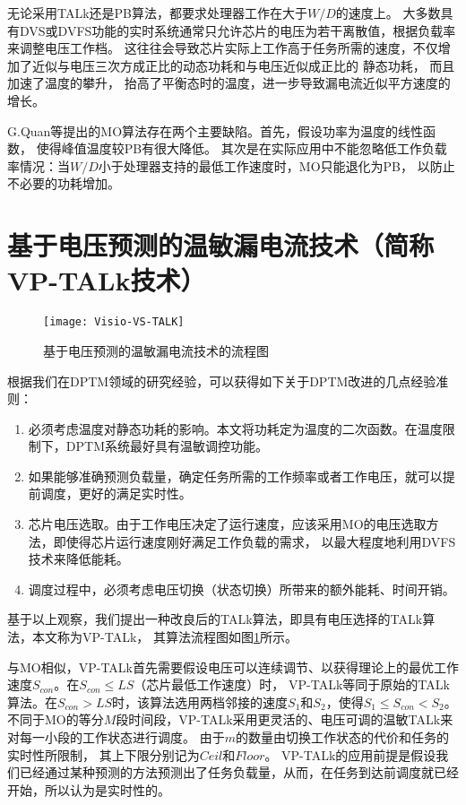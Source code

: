 无论采用TALk还是PB算法，都要求处理器工作在大于$W/D$的速度上。 大多数具有DVS或DVFS功能的实时系统通常只允许芯片的电压为若干离散值，根据负载率来调整电压工作档。 这往往会导致芯片实际上工作高于任务所需的速度，不仅增加了近似与电压三次方成正比的动态功耗和与电压近似成正比的 静态功耗， 而且加速了温度的攀升， 抬高了平衡态时的温度，进一步导致漏电流近似平方速度的增长。

G.Quan等提出的MO算法存在两个主要缺陷。首先，假设功率为温度的线性函数， 使得峰值温度较PB有很大降低。 其次是在实际应用中不能忽略低工作负载率情况：当$W/D$小于处理器支持的最低工作速度时，MO只能退化为PB， 以防止不必要的功耗增加。

\section{基于电压预测的温敏漏电流技术（简称VP-TALk技术）}
\begin{figure}[H] %
  \centering
  \texttt{[image: Visio-VS-TALK]}
  \caption{基于电压预测的温敏漏电流技术的流程图}
  \label{fig:vp-talk}
\end{figure}
\label{sec:vp-talk}
根据我们在DPTM领域的研究经验，可以获得如下关于DPTM改进的几点经验准则：
\begin{enumerate}[1)]
\item 必须考虑温度对静态功耗的影响。本文将功耗定为温度的二次函数。在温度限制下，DPTM系统最好具有温敏调控功能。
\item 如果能够准确预测负载量，确定任务所需的工作频率或者工作电压，就可以提前调度，更好的满足实时性。
\item 芯片电压选取。由于工作电压决定了运行速度，应该采用MO的电压选取方法，即使得芯片运行速度刚好满足工作负载的需求， 以最大程度地利用DVFS技术来降低能耗。
\item 调度过程中，必须考虑电压切换（状态切换）所带来的额外能耗、时间开销。
\end{enumerate}

基于以上观察，我们提出一种改良后的TALk算法，即具有电压选择的TALk算法，本文称为VP-TALk， 其算法流程图如图\ref{fig:vp-talk}所示。

与MO相似，VP-TALk首先需要假设电压可以连续调节、以获得理论上的最优工作速度$S_{con}$。在$S_{con}\leq LS$（芯片最低工作速度）时， VP-TALk等同于原始的TALk算法。在$S_{con}>{LS}$时，该算法选用两档邻接的速度$S_1$和$S_2$，使得$S_1\leq S_{con}<S_2$。 不同于MO的等分$M$段时间段，VP-TALk采用更灵活的、电压可调的温敏TALk来对每一小段的工作状态进行调度。 由于$m$的数量由切换工作状态的代价和任务的实时性所限制， 其上下限分别记为$Ceil$和$Floor$。 VP-TALk的应用前提是假设我们已经通过某种预测的方法预测出了任务负载量，从而，在任务到达前调度就已经开始，所以认为是实时性的。



